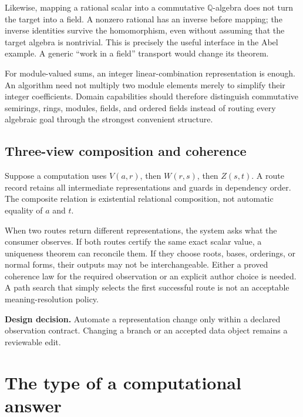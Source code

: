 \documentclass[11pt,a4paper]{article}
\newcommand{\Q}{\mathbb{Q}}
\newcommand{\design}[1]{\par\smallskip\noindent\textbf{Design decision.} #1\par\smallskip}
\theoremstyle{definition}
\begin{document}
Likewise, mapping a rational scalar into a commutative $\Q$-algebra does not
turn the target into a field. A nonzero rational has an inverse before mapping;
the inverse identities survive the homomorphism, even without assuming that the
target algebra is nontrivial. This is precisely the useful interface in the
Abel example. A generic ``work in a field'' transport would change its theorem.

For module-valued sums, an integer linear-combination representation is enough.
An algorithm need not multiply two module elements merely to simplify their
integer coefficients. Domain capabilities should therefore distinguish
commutative semirings, rings, modules, fields, and ordered fields instead of
routing every algebraic goal through the strongest convenient structure.

\subsection{Three-view composition and coherence}
Suppose a computation uses $V(a,r)$, then $W(r,s)$, then $Z(s,t)$. A route record
retains all intermediate representations and guards in dependency order. The
composite relation is existential relational composition, not automatic equality
of $a$ and $t$.

When two routes return different representations, the system asks what the
consumer observes. If both routes certify the same exact scalar value, a
uniqueness theorem can reconcile them. If they choose roots, bases, orderings,
or normal forms, their outputs may not be interchangeable. Either a proved
coherence law for the required observation or an explicit author choice is needed.
A path search that simply selects the first successful route is not an acceptable
meaning-resolution policy.

\design{Automate a representation change only within a declared observation
contract. Changing a branch or an accepted data object remains a reviewable edit.}

\section{The type of a computational answer}
\label{sec:answers}
\end{document}
